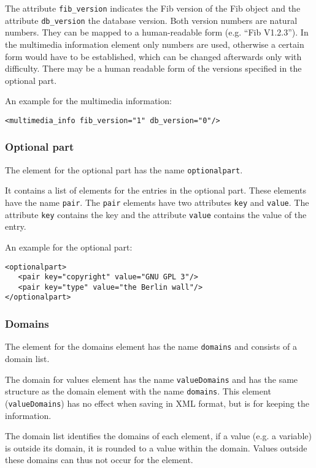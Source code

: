 The attribute \verb|fib_version| indicates the Fib version of the Fib object and the attribute \verb|db_version| the database version. Both version numbers are natural numbers. They can be mapped to a human-readable form (e.g. ``Fib V1.2.3''). In the multimedia information element only numbers are used, otherwise a certain form would have to be established, which can be changed afterwards only with difficulty. There may be a human readable form of the versions specified in the optional part.

\bigskip\noindent
An example for the multimedia information:
\begin{verbatim}
<multimedia_info fib_version="1" db_version="0"/>
\end{verbatim}


\subsubsection{Optional part}
\label{secXmlRootOptionalPart}

The element for the optional part has the name \verb|optionalpart|.

It contains a list of elements for the entries in the optional part. These elements have the name \verb|pair|. The \verb|pair| elements have two attributes \verb|key| and \verb|value|.
The attribute \verb|key| contains the key and the attribute \verb|value| contains the value of the entry.

\bigskip\noindent
An example for the optional part:
\begin{verbatim}
<optionalpart>
   <pair key="copyright" value="GNU GPL 3"/>
   <pair key="type" value="the Berlin wall"/>
</optionalpart>
\end{verbatim}


\subsubsection{Domains}
\label{secXmlDefinitionranges}

The element for the domains element has the name \verb|domains| and consists of a domain list.

The domain for values element has the name \verb|valueDomains| and has the same structure as the domain element with the name \verb|domains|. This element (\verb|valueDomains|) has no effect when saving in XML format, but is for keeping the information.

The domain list identifies the domains of each element, if a value (e.g. a variable) is outside its domain, it is rounded to a value within the domain. Values outside these domains can thus not occur for the element.

